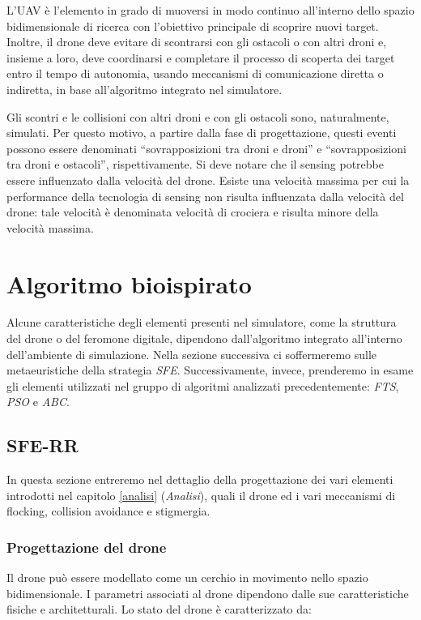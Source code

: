 L'UAV è l'elemento in grado di muoversi in modo continuo all’interno dello spazio bidimensionale di ricerca con l’obiettivo principale di scoprire nuovi target. 
Inoltre, il drone deve evitare di scontrarsi con gli ostacoli o con altri droni e, insieme a loro, deve coordinarsi e completare il processo di scoperta dei target entro il tempo di autonomia, usando meccanismi di comunicazione diretta o indiretta, in base all’algoritmo integrato nel simulatore. 

Gli scontri e le collisioni con altri droni e con gli ostacoli sono, naturalmente, simulati. 
Per questo motivo, a partire dalla fase di progettazione, questi eventi possono essere denominati “sovrapposizioni tra droni e droni” e “sovrapposizioni tra droni e ostacoli”, rispettivamente. 
Si deve notare che il sensing potrebbe essere influenzato dalla velocità del drone. 
Esiste una velocità massima per cui la performance della tecnologia di sensing non risulta influenzata dalla velocità del drone: tale velocità è denominata velocità di crociera e risulta minore della velocità massima.

\section {Algoritmo bioispirato}

Alcune caratteristiche degli elementi presenti nel simulatore, come la struttura del drone o del feromone digitale, dipendono dall'algoritmo integrato all'interno dell'ambiente di simulazione.
Nella sezione successiva ci soffermeremo sulle metaeuristiche della strategia \textit{SFE}.
Successivamente, invece, prenderemo in esame gli elementi utilizzati nel gruppo di algoritmi analizzati precedentemente: \textit{FTS}, \textit{PSO} e \textit{ABC}.

\subsection{SFE-RR}

In questa sezione entreremo nel dettaglio della progettazione dei vari elementi introdotti nel capitolo \ref{analisi} (\textit{Analisi}), quali il drone ed i vari meccanismi di flocking, collision avoidance e stigmergia.

\subsubsection{Progettazione del drone}

Il drone può essere modellato come un cerchio in movimento nello spazio bidimensionale. 
I parametri associati al drone dipendono dalle sue caratteristiche fisiche e architetturali. 
Lo stato del drone è caratterizzato da:

